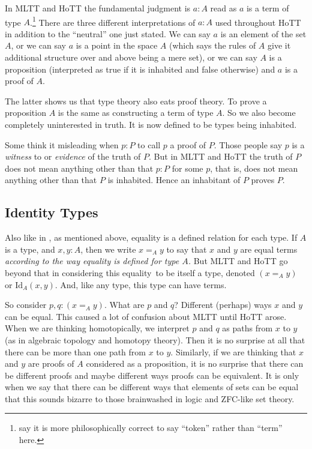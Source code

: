 \documentclass[11pt]{article}
\begin{document}
In MLTT and HoTT the fundamental judgment is $a : A$
read as $a$ is a term of type $A$.\footnote{\citet{ladyman-presnell} say
it is more philosophically correct to say ``token'' rather than ``term'' here.}
There are three different interpretations of $a : A$ used throughout HoTT
in addition to the ``neutral'' one just stated.
We can say $a$ is an element of the set $A$, or we can say $a$ is a point
in the space $A$ (which says the rules of $A$ give it additional structure
over and above being a mere set),
or we can say $A$ is a proposition (interpreted
as true if it is inhabited and false otherwise) and $a$ is a proof of $A$.
 
The latter shows us that type theory also eats proof theory.  To prove a
proposition $A$ is the same as constructing a term of type $A$.  So we also
become completely uninterested in truth.  It is now defined to be types
being inhabited.

Some think it misleading when $p : P$ to call $p$ a proof of $P$.
Those people say $p$ is
a \emph{witness} to or \emph{evidence} of the truth of $P$.  But in MLTT
and HoTT the truth of $P$ does not mean anything other than that $p : P$ for
some $p$, that is, does not mean anything other than that $P$ is inhabited.
Hence an inhabitant of $P$ proves $P$.

\subsection{Identity Types}
\label{sec:identity}

Also like in \citet{bishop}, as mentioned above, equality is a defined
relation for each type.
If $A$ is a type, and $x, y : A$, then we write $x =_A y$ to say that
$x$ and $y$ are equal terms \emph{according to the way equality is defined
for type $A$.}  But MLTT and HoTT go beyond that in considering this equality\
to be itself a type, denoted $(x =_A y)$ or $\text{Id}_A(x, y)$.
And, like any type, this type can have terms.

So consider $p, q : (x =_A y)$.
What are $p$ and $q$?  Different (perhaps) ways $x$ and $y$ can be equal.
This caused a lot of confusion about MLTT until HoTT arose.
When we are thinking homotopically, we interpret $p$ and $q$ as paths
from $x$ to $y$ (as in algebraic topology and homotopy theory).  Then
it is no surprise at all that there can be more than one path from $x$
to $y$.  Similarly, if we are thinking that $x$ and $y$ are proofs of
$A$ considered as a proposition, it is no surprise that there can be
different proofs and maybe different ways proofs can be equivalent.
It is only when we say that there can be different ways that elements
of sets can be equal that this sounds bizarre to those brainwashed in
logic and ZFC-like set theory.
\end{document}
